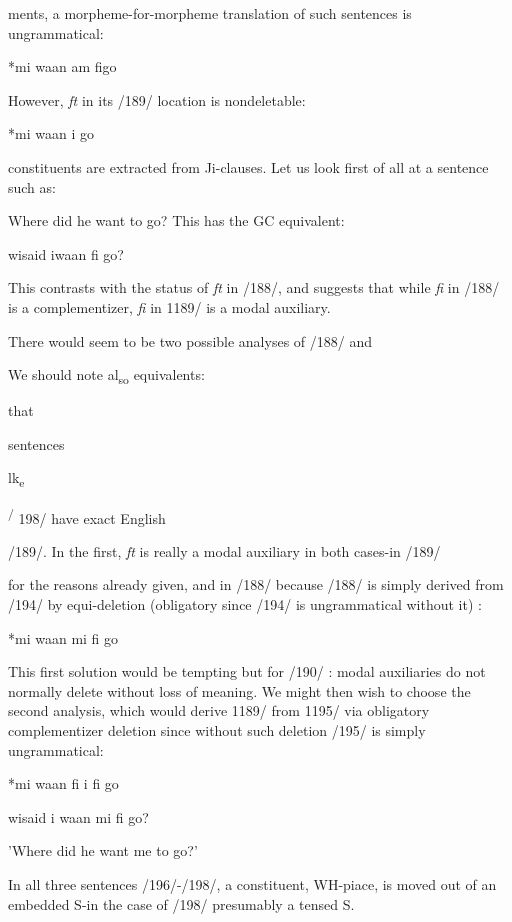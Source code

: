ments, a morpheme-for-morpheme translation of such sentences is ungrammatical:

\ea\label{ex:192}
 *mi waan am figo
\glt
\z

However, \textit{ft} in its /189/ location is nondeletable:

\ea\label{ex:193}
 *mi waan i go
\glt
\z


constituents are extracted from Ji-clauses. Let us look first of all at
a sentence such as:

\ea\label{ex:196}
 Where did he want to go? This has the GC equivalent:
\glt
\z

\ea\label{ex:197}
 wisaid iwaan fi go?
\glt
\z

This contrasts with the status of \textit{ft} in /188/, and suggests that while
\textit{fi} in /188/ is a complementizer, \textit{fi} in 1189/ is a modal auxiliary.

There would seem to be two possible analyses of /188/ and

We should note al\textsubscript{so}\textsubscript{ }equivalents:

that

sentences

l{\textquotedbl}k\textsubscript{e}

\textsuperscript{/} 198/ have exact English

/189/. In the first, \textit{ft} is really a modal auxiliary in both cases-in /189/

for the reasons already given, and in /188/ because /188/ is simply derived from /194/ by equi{}-deletion (obligatory since /194/ is un\-grammatical without it) :

\ea\label{ex:194}
 *mi waan mi fi go
\glt
\z

This first solution would be tempting but for /190/ : modal auxiliaries do not normally delete without loss of meaning. We might then wish to choose the second analysis, which would derive 1189/ from 1195/ via obligatory complementizer deletion since without such deletion /195/ is simply ungrammatical:

\ea\label{ex:195}
 *mi waan fi i fi go
\glt
\z

\ea\label{ex:198}
 wisaid i waan mi fi go?
\glt
\z

'Where did he want me to go?'

In all three sentences /196/-/198/, a constituent, WH-piace, is moved out of an embedded S-in the case of /198/ presumably a tensed S.

